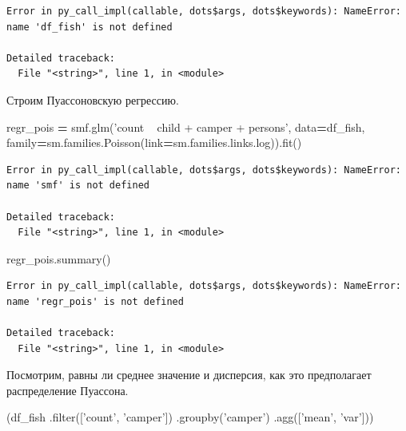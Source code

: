 \documentclass[]{book}
\newenvironment{Shaded}{\begin{snugshade}}{\end{snugshade}}
\newcommand{\BuiltInTok}[1]{#1}
\newcommand{\NormalTok}[1]{#1}
\newcommand{\OperatorTok}[1]{\textcolor[rgb]{0.81,0.36,0.00}{\textbf{#1}}}
\newcommand{\StringTok}[1]{\textcolor[rgb]{0.31,0.60,0.02}{#1}}
\begin{document}
\begin{verbatim}
Error in py_call_impl(callable, dots$args, dots$keywords): NameError: name 'df_fish' is not defined

Detailed traceback: 
  File "<string>", line 1, in <module>
\end{verbatim}

Строим Пуассоновскую регрессию.

\begin{Shaded}
\begin{Highlighting}[]
\NormalTok{regr_pois }\OperatorTok{=}\NormalTok{ smf.glm(}\StringTok{'count ~ child + camper +  persons'}\NormalTok{, data}\OperatorTok{=}\NormalTok{df_fish,}
\NormalTok{                    family}\OperatorTok{=}\NormalTok{sm.families.Poisson(link}\OperatorTok{=}\NormalTok{sm.families.links.log)).fit()}
\end{Highlighting}
\end{Shaded}

\begin{verbatim}
Error in py_call_impl(callable, dots$args, dots$keywords): NameError: name 'smf' is not defined

Detailed traceback: 
  File "<string>", line 1, in <module>
\end{verbatim}

\begin{Shaded}
\begin{Highlighting}[]
\NormalTok{regr_pois.summary()}
\end{Highlighting}
\end{Shaded}

\begin{verbatim}
Error in py_call_impl(callable, dots$args, dots$keywords): NameError: name 'regr_pois' is not defined

Detailed traceback: 
  File "<string>", line 1, in <module>
\end{verbatim}

Посмотрим, равны ли среднее значение и дисперсия, как это предполагает распределение Пуассона.

\begin{Shaded}
\begin{Highlighting}[]
\NormalTok{(df_fish}
\NormalTok{ .}\BuiltInTok{filter}\NormalTok{([}\StringTok{'count'}\NormalTok{, }\StringTok{'camper'}\NormalTok{])}
\NormalTok{ .groupby(}\StringTok{'camper'}\NormalTok{)}
\NormalTok{ .agg([}\StringTok{'mean'}\NormalTok{, }\StringTok{'var'}\NormalTok{]))}
\end{Highlighting}
\end{Shaded}
\end{document}
